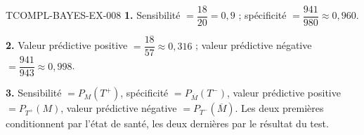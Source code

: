 \begin{corrige}{TCOMPL-BAYES-EX-008}
\textbf{1.} Sensibilité $=\dfrac{18}{20}=0{,}9$ ; spécificité
$=\dfrac{941}{980}\approx0{,}960$.

\textbf{2.} Valeur prédictive positive $=\dfrac{18}{57}\approx0{,}316$ ;
valeur prédictive négative $=\dfrac{941}{943}\approx0{,}998$.

\textbf{3.} Sensibilité $=P_M(T^+)$, spécificité
$=P_{\overline M}(T^-)$, valeur prédictive positive $=P_{T^+}(M)$, valeur
prédictive négative $=P_{T^-}(\overline M)$. Les deux premières conditionnent
par l'état de santé, les deux dernières par le résultat du test.
\end{corrige}
